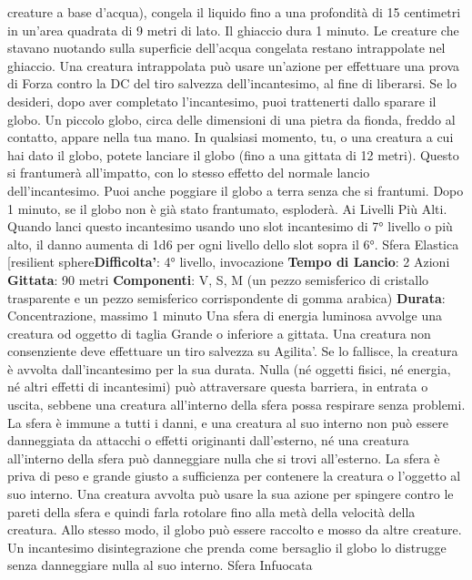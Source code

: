 \begin{multicols}{2}
creature a base d’acqua), congela il liquido fino a una
profondità di 15 centimetri in un’area quadrata di 9 metri
di lato. Il ghiaccio dura 1 minuto. Le creature che
stavano nuotando sulla superficie dell’acqua congelata
restano intrappolate nel ghiaccio. Una creatura
intrappolata può usare un’azione per effettuare una
prova di Forza contro la DC del tiro salvezza
dell’incantesimo, al fine di liberarsi.
Se lo desideri, dopo aver completato l’incantesimo, puoi
trattenerti dallo sparare il globo. Un piccolo globo, circa
delle dimensioni di una pietra da fionda, freddo al
contatto, appare nella tua mano. In qualsiasi momento,
tu, o una creatura a cui hai dato il globo, potete lanciare
il globo (fino a una gittata di 12 metri). Questo si
frantumerà all’impatto, con lo stesso effetto del normale
lancio dell’incantesimo. Puoi anche poggiare il globo a
terra senza che si frantumi. Dopo 1 minuto, se il globo
non è già stato frantumato, esploderà.
Ai Livelli Più Alti. Quando lanci questo incantesimo
usando uno slot incantesimo di 7° livello o più alto, il
danno aumenta di 1d6 per ogni livello dello slot sopra il
6°.
Sfera Elastica
[resilient sphere\textbf{Difficolta'}:
4° livello, invocazione
\textbf{Tempo di Lancio}: 2 Azioni
\textbf{Gittata}: 90 metri
\textbf{Componenti}: V, S, M (un pezzo semisferico di cristallo
trasparente e un pezzo semisferico corrispondente di
gomma arabica)
\textbf{Durata}: Concentrazione, massimo 1 minuto
Una sfera di energia luminosa avvolge una creatura od
oggetto di taglia Grande o inferiore a gittata. Una
creatura non consenziente deve effettuare un tiro 
salvezza su Agilita'. Se lo fallisce, la creatura è
avvolta dall’incantesimo per la sua durata.
Nulla (né oggetti fisici, né energia, né altri effetti di
incantesimi) può attraversare questa barriera, in entrata
o uscita, sebbene una creatura all’interno della sfera
possa respirare senza problemi. La sfera è immune a
tutti i danni, e una creatura al suo interno non può
essere danneggiata da attacchi o effetti originanti
dall’esterno, né una creatura all’interno della sfera può
danneggiare nulla che si trovi all’esterno.
La sfera è priva di peso e grande giusto a sufficienza
per contenere la creatura o l’oggetto al suo interno. Una
creatura avvolta può usare la sua azione per spingere
contro le pareti della sfera e quindi farla rotolare fino
alla metà della velocità della creatura. Allo stesso
modo, il globo può essere raccolto e mosso da altre
creature.
Un incantesimo disintegrazione che prenda come
bersaglio il globo lo distrugge senza danneggiare nulla
al suo interno.
Sfera Infuocata

\end{multicols}
